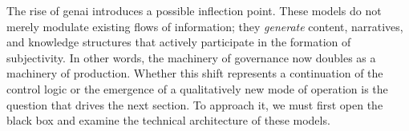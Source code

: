 The rise of \gls{genai} introduces a possible inflection point. These models do not merely modulate existing flows of information; they \emph{generate} content, narratives, and knowledge structures that actively participate in the formation of subjectivity. In other words, the machinery of governance now doubles as a machinery of production. Whether this shift represents a continuation of the control logic or the emergence of a qualitatively new mode of operation is the question that drives the next section. To approach it, we must first open the black box and examine the technical architecture of these models.



